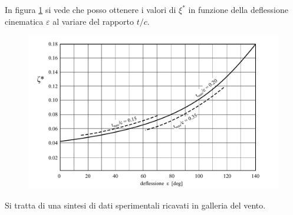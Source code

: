 In figura \ref{fig:Soderberg} si vede che posso ottenere i valori di $\xi^*$ in funzione della deflessione cinematica $\varepsilon$ al variare del rapporto $t/c$.
\begin{figure}
\centering
  \includegraphics[width=\textwidth]{fig/Soderberg.pdf}
\caption{}
\label{fig:Soderberg}
\end{figure}
Si tratta di una sintesi di dati sperimentali ricavati in galleria del vento.

